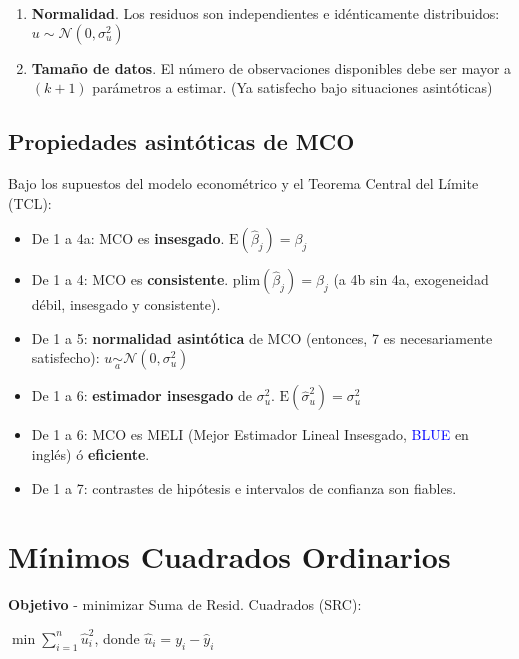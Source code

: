 \documentclass[10pt, a4paper, landscape]{article}
\newcommand{\E}{\mathrm{E}}
\begin{document}
\begin{multicols}{3}
\begin{enumerate}[leftmargin=*]
			\item \textbf{Normalidad}. Los residuos son independientes e idénticamente distribuidos: $u \sim \mathcal{N}(0, \sigma^{2}_{u})$
			\item \textbf{Tamaño de datos}. El número de observaciones disponibles debe ser mayor a $(k + 1)$ parámetros a estimar. (Ya satisfecho bajo situaciones asintóticas)
		\end{enumerate}
		
		\subsection*{Propiedades asintóticas de MCO}
		
		Bajo los supuestos del modelo econométrico y el Teorema Central del Límite (TCL):
		
		\begin{itemize}[leftmargin=*]
			\item De 1 a 4a: MCO es \textbf{insesgado}. $\E(\hat{\beta}_{j}) = \beta_{j}$
			\item De 1 a 4: MCO es \textbf{consistente}. $\mathrm{plim}(\hat{\beta}_{j}) = \beta_{j}$ (a 4b sin 4a, exogeneidad	débil, insesgado y consistente).
			\item De 1 a 5: \textbf{normalidad asintótica} de MCO (entonces, 7 es necesariamente satisfecho): $u \underset{a}{\sim}\mathcal{N}(0, \sigma^{2}_{u})$
			\item De 1 a 6: \textbf{estimador insesgado} de $\sigma^{2}_{u}$. $\E(\hat{\sigma}^{2}_{u}) = \sigma^{2}_{u}$
			\item De 1 a 6: MCO es MELI (Mejor Estimador Lineal Insesgado, \textcolor{blue}{BLUE} en inglés) ó \textbf{eficiente}.
			\item De 1 a 7: contrastes de hipótesis e intervalos de confianza son fiables.
		\end{itemize}
		
		\columnbreak
		
		\section*{Mínimos Cuadrados Ordinarios}
		
		\textbf{Objetivo} - minimizar Suma de Resid. Cuadrados (SRC):
		
		\begin{center}
			$\min \sum_{i=1}^{n} \hat{u}^{2}_{i}$, donde $\hat{u}_{i} = y_{i} - \hat{y}_{i}$
		\end{center}
		

\end{multicols}
\end{document}
